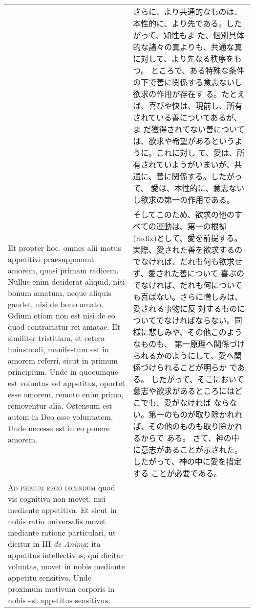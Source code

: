 \documentclass[10pt]{jsarticle} %
\begin{document}
\begin{longtable}{p{21em}p{21em}}
&

さらに、より共通的なものは、本性的に、より先である。したがって、知性もま
 た、個別具体的な諸々の真よりも、共通な真に対して、より先なる秩序をもつ。
 ところで、ある特殊な条件の下で善に関係する意志ないし欲求の作用が存在す
 る。たとえば、喜びや快は、現前し、所有されている善についてあるが、ま
 だ獲得されてない善については、欲求や希望があるというように。これに対し
 て、愛は、所有されていようがいまいが、共通に、善に関係する。したがって、
 愛は、本性的に、意志ないし欲求の第一の作用である。


\\



Et propter hoc, omnes alii motus
appetitivi praesupponunt amorem, quasi primam radicem. Nullus enim
desiderat aliquid, nisi bonum amatum, neque aliquis gaudet, nisi de bono
amato. Odium etiam non est nisi de eo quod contrariatur rei amatae. Et
similiter tristitiam, et cetera huiusmodi, manifestum est in amorem
referri, sicut in primum principium. Unde in quocumque est voluntas vel
appetitus, oportet esse amorem, remoto enim primo, removentur
alia. Ostensum est autem in Deo esse voluntatem. Unde necesse est in eo
ponere amorem.



&

そしてこのため、欲求の他のすべての運動は、第一の根拠(radix)として、愛を前提する。
実際、愛された善を欲求するのでなければ、だれも何も欲求せず、愛された善について
喜ぶのでなければ、だれも何についても喜ばない。さらに憎しみは、愛される事物に反
 対するものについてでなければならない。同様に悲しみや、その他このようなものも、
 第一原理へ関係づけられるかのようにして、愛へ関係づけられることが明らか
 である。
したがって、そこにおいて意志や欲求があるところにはどこでも、愛がなければ
 ならない。第一のものが取り除かれれば、その他のものも取り除かれるからで
 ある。
さて、神の中に意志があることが示された。したがって、神の中に愛を措定する
 ことが必要である。


\\



{\scshape Ad primum ergo dicendum} quod vis cognitiva
non movet, nisi mediante appetitiva. Et sicut in nobis ratio universalis
movet mediante ratione particulari, ut dicitur in III {\itshape de Anima}; ita
appetitus intellectivus, qui dicitur voluntas, movet in nobis mediante
appetitu sensitivo. Unde proximum motivum corporis in nobis est
appetitus sensitivus. 


&


\end{longtable}
\end{document}
